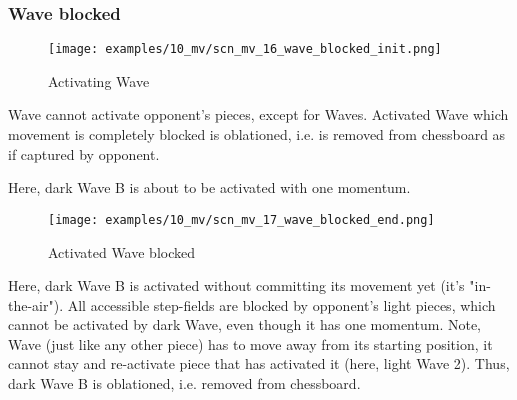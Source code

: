\clearpage %

\subsubsection*{Wave blocked}

\vspace*{-1.4\baselineskip}
\noindent
\begin{figure}[h]
\texttt{[image: examples/10\_mv/scn\_mv\_16\_wave\_blocked\_init.png]}
\caption{Activating Wave}
\label{fig:scn_mv_16_wave_blocked_init}
\end{figure}

Wave cannot activate opponent's pieces, except for Waves. Activated Wave which movement
is completely blocked is oblationed, i.e. is removed from chessboard as if captured by
opponent.

Here, dark Wave B is about to be activated with one momentum.

\clearpage %

\vspace*{-2.1\baselineskip}
\noindent
\begin{figure}[h]
\texttt{[image: examples/10\_mv/scn\_mv\_17\_wave\_blocked\_end.png]}
\caption{Activated Wave blocked}
\label{fig:scn_mv_17_wave_blocked_end}
\end{figure}

Here, dark Wave B is activated without committing its movement yet (it's "in-the-air").
All accessible step-fields are blocked by opponent's light pieces, which cannot be
activated by dark Wave, even though it has one momentum.
Note, Wave (just like any other piece) has to move away from its starting position,
it cannot stay and re-activate piece that has activated it (here, light Wave 2).
Thus, dark Wave B is oblationed, i.e. removed from chessboard.

\clearpage %

